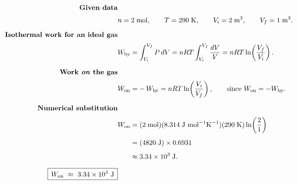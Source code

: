 \documentclass[12pt]{article}
\title{}
\author{Jerich Lee}
\date{\today}
\theoremstyle{definition} %
\theoremstyle{plain} %
\begin{document}
\maketitle
\begin{align}
  \textbf{Given data}\\[2pt]
  &n = 2\;\text{mol}, \qquad 
  T = 290\;\text{K}, \qquad 
  V_i = 2\;\text{m}^3,\qquad 
  V_f = 1\;\text{m}^3.\\[6pt]
  \textbf{Isothermal work for an ideal gas}\\[2pt]
  &\displaystyle W_{\text{by}} = \int_{V_i}^{V_f} P\,dV = nRT\int_{V_i}^{V_f}\frac{dV}{V}
        = nRT\ln\!\left(\frac{V_f}{V_i}\right).\\[6pt]
  \textbf{Work \emph{on} the gas} \\[2pt]
  &\displaystyle W_{\text{on}} = -\,W_{\text{by}}
        = nRT\ln\!\left(\frac{V_i}{V_f}\right), \qquad 
        \text{since } W_{\text{on}} = -W_{\text{by}}.\\[6pt]
  \textbf{Numerical substitution}\\[2pt]
  &\displaystyle W_{\text{on}} 
     = (2\;\text{mol})(8.314\;\text{J mol}^{-1}\text{K}^{-1})(290\;\text{K})
       \ln\!\left(\frac{2}{1}\right) \\[4pt]
  &\displaystyle \phantom{W_{\text{on}} }
     = (4820\;\text{J})\times 0.6931 \\[4pt]
  &\displaystyle \phantom{W_{\text{on}} }
     \approx 3.34\times 10^{3}\;\text{J}.\\[6pt]
  \boxed{\,W_{\text{on}}\ \approx\ 3.34\times 10^{3}\ \text{J}\,}
  \end{align}
\end{document}
